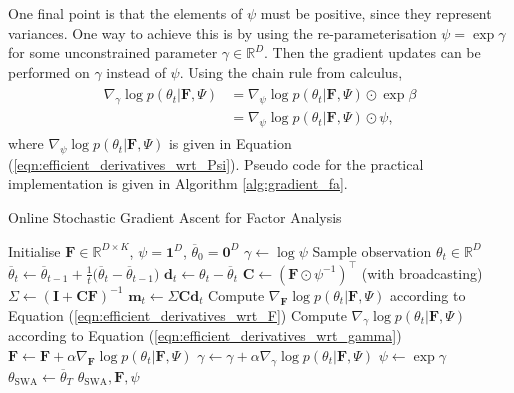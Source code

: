 \documentclass[msc,deptreport.inf]{infthesis} %
\newcommand{\matr}[1]{\mathbf{#1}}
\newcommand{\R}{\mathbb R}
\begin{document}
One final point is that the elements of $\psi$ must be positive, since they represent variances. One way to achieve this is by using the re-parameterisation $\psi = \exp \gamma$ for some unconstrained parameter $\gamma \in \R^D$. Then the gradient updates can be performed on $\gamma$ instead of $\psi$. Using the chain rule from calculus, 
\begin{align}
\begin{split}\label{eqn:efficient_derivatives_wrt_gamma}
	\nabla_{\gamma} \log p(\theta_t | \matr{F}, \Psi)
	& = \nabla_{\psi} \log p(\theta_t | \matr{F}, \Psi) \odot \exp \beta \\
	& = \nabla_{\psi} \log p(\theta_t | \matr{F}, \Psi) \odot \psi,
\end{split}
\end{align} 
where $\nabla_{\psi} \log p(\theta_t | \matr{F}, \Psi)$ is given in Equation (\ref{eqn:efficient_derivatives_wrt_Psi}). Pseudo code for the practical implementation is given in Algorithm \ref{alg:gradient_fa}.

\begin{algorithm}[!htbp] 
	\caption{Online Stochastic Gradient Ascent for Factor Analysis}
	\label{alg:gradient_fa}
	\begin{algorithmic}[1]
		\State Initialise $\matr{F} \in \R^{D \times K}$, $\psi = \matr{1}^D$, $\overline{\theta}_0 = \matr{0}^D$
		\State $\gamma \leftarrow \log \psi$
			\State Sample observation $\theta_t \in \R^D$
			\State
				$\overline{\theta}_t \leftarrow  \overline{\theta}_{t-1} + \frac{1}{t}\big(\overline{\theta}_t - \overline{\theta}_{t-1}\big)$
			\State $\matr{d}_t \leftarrow \theta_t - \overline{\theta}_t$
			\State $\matr{C} \leftarrow (\matr{F} \odot \psi^{-1})^\intercal$ (with broadcasting)
			\State $\Sigma \leftarrow (\matr{I} + \matr{C} \matr{F})^{-1}$ 
			\State $\matr{m}_t \leftarrow \Sigma \matr{C} \matr{d}_t$ 
			\State Compute $\nabla_{\matr{F}} \log p(\theta_t | \matr{F}, \Psi)$ 
			according to Equation (\ref{eqn:efficient_derivatives_wrt_F})
			\State Compute $\nabla_{\gamma} \log p(\theta_t | \matr{F}, \Psi)$ 
			according to Equation (\ref{eqn:efficient_derivatives_wrt_gamma})
			\State $\matr{F} \leftarrow \matr{F} + \alpha \nabla_{\matr{F}} \log p(\theta_t | \matr{F}, \Psi)$
			\State $\gamma \leftarrow \gamma + \alpha \nabla_{\gamma} \log p(\theta_t | \matr{F}, \Psi)$
			\State $\psi \leftarrow \exp \gamma$
		\EndFor
		\State $\theta_{\text{SWA}} \leftarrow \overline{\theta}_T$
		\State \Return $\theta_{\text{SWA}}, \matr{F}, \psi$
	\end{algorithmic}
\end{algorithm}
\end{document}
